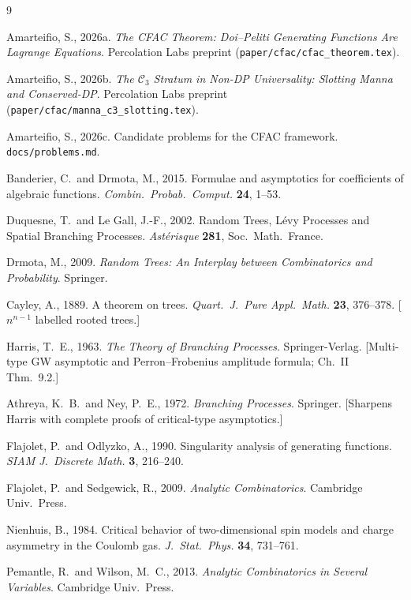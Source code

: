 \documentclass[11pt,a4paper]{article}
\theoremstyle{plain}
\theoremstyle{definition}
\begin{document}
\begin{thebibliography}{9}

  Amarteifio, S., 2026a.
  \textit{The CFAC Theorem: Doi--Peliti Generating Functions Are
  Lagrange Equations}.  Percolation Labs preprint
  (\texttt{paper/cfac/cfac\_theorem.tex}).

  Amarteifio, S., 2026b.
  \textit{The $\mathcal{C}_3$ Stratum in Non-DP Universality:
  Slotting Manna and Conserved-DP}.
  Percolation Labs preprint
  (\texttt{paper/cfac/manna\_c3\_slotting.tex}).

  Amarteifio, S., 2026c.
  Candidate problems for the CFAC framework.
  \texttt{docs/problems.md}.

  Banderier, C.\ and Drmota, M., 2015.
  Formulae and asymptotics for coefficients of algebraic functions.
  \textit{Combin.\ Probab.\ Comput.} \textbf{24}, 1--53.

  Duquesne, T.\ and Le Gall, J.-F., 2002.
  Random Trees, L\'evy Processes and Spatial Branching Processes.
  \textit{Ast\'erisque} \textbf{281}, Soc.\ Math.\ France.

  Drmota, M., 2009.
  \textit{Random Trees: An Interplay between Combinatorics and
  Probability}.  Springer.

  Cayley, A., 1889.
  A theorem on trees.
  \textit{Quart.\ J.\ Pure Appl.\ Math.} \textbf{23}, 376--378.
  [$n^{n-1}$ labelled rooted trees.]

  Harris, T.~E., 1963.
  \textit{The Theory of Branching Processes}.  Springer-Verlag.
  [Multi-type GW asymptotic and Perron--Frobenius amplitude formula;
  Ch.~II Thm.~9.2.]

  Athreya, K.~B.\ and Ney, P.~E., 1972.
  \textit{Branching Processes}.  Springer.
  [Sharpens Harris with complete proofs of critical-type asymptotics.]

  Flajolet, P.\ and Odlyzko, A., 1990.
  Singularity analysis of generating functions.
  \textit{SIAM J.\ Discrete Math.} \textbf{3}, 216--240.

  Flajolet, P.\ and Sedgewick, R., 2009.
  \textit{Analytic Combinatorics}.  Cambridge Univ.\ Press.

  Nienhuis, B., 1984.
  Critical behavior of two-dimensional spin models and
  charge asymmetry in the Coulomb gas.
  \textit{J.\ Stat.\ Phys.} \textbf{34}, 731--761.

  Pemantle, R.\ and Wilson, M.~C., 2013.
  \textit{Analytic Combinatorics in Several Variables}.
  Cambridge Univ.\ Press.

\end{thebibliography}
\end{document}
